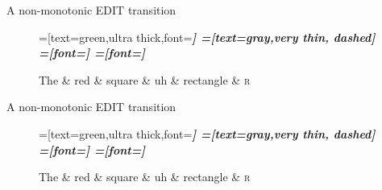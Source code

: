 \documentclass{lecture}
\begin{document}
\begin{plain}{A non-monotonic EDIT transition}
\begin{figure}
    \centering
    \begin{dependency}[theme=simple]
    =[text=green,ultra thick,font=\bfseries\itshape]
    =[text=gray,very thin, dashed]
    =[font=\bfseries\itshape]
    =[font=\itshape]
    \begin{deptext}[column sep=.075cm, row sep=.1ex]
        The \& red \& square \& uh \& rectangle \&  \textsc{r} \\
    \end{deptext}
\end{dependency}
\end{figure}
\end{plain}


\begin{plain}{A non-monotonic EDIT transition}
\begin{figure}
    \centering
    \begin{dependency}[theme=simple]
    =[text=green,ultra thick,font=\bfseries\itshape]
    =[text=gray,very thin, dashed]
    =[font=\bfseries\itshape]
    =[font=\itshape]
    \begin{deptext}[column sep=.075cm, row sep=.1ex]
        The \& red \& square \& uh \& rectangle \&  \textsc{r} \\
    \end{deptext}
\end{dependency}
\end{figure}
\end{plain}
\end{document}

